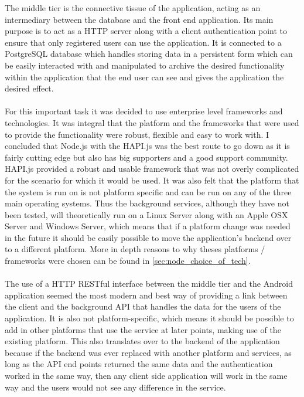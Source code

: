 The middle tier is the connective tissue of the application, acting as an intermediary between the database and the front end application. Its main purpose is to act as a HTTP server along with a client authentication point to ensure that only registered users can use the application. It is connected to a PostgreSQL database which handles storing data in a persistent form which can be easily interacted with and manipulated to archive the desired functionality within the application that the end user can see and gives the application the desired effect.\\
\\
For this important task it was decided to use enterprise level frameworks and technologies. It was integral that the platform and the frameworks that were used to provide the functionality were robust, flexible and easy to work with. I concluded that Node.js \cite{nodeteam:node:2015:online} with the HAPI.js \cite{hapiteam:hapti:2015:online} was the best route to go down as it is fairly cutting edge but also has big supporters and a good support community. HAPI.js provided a robust and usable framework that was not overly complicated for the scenario for which it would be used. It was also felt that the platform that the system is run on is not platform specific and can be run on any of the three main operating systems. Thus the background services, although they have not been tested, will theoretically run on a Linux Server along with an Apple OSX Server and Windows Server, which means that if a platform change was needed in the future it should be easily possible to move the application's backend over to a different platform. More in depth reasons to why theses platforms / frameworks were chosen can be found in \ref{sec:node_choice_of_tech}.\\
\\
The use of a HTTP RESTful interface between the middle tier and the Android application seemed the most modern and best way of providing a link between the client and the background API that handles the data for the users of the application. It is also not platform-specific, which means it should be possible to add in other platforms that use the service at later points, making use of the existing platform. This also translates over to the backend of the application because if the backend was ever replaced with another platform and services, as long as the API end points returned the same data and the authentication worked in the same way, then any client side application will work in the same way and the users would not see any difference in the service.\\
